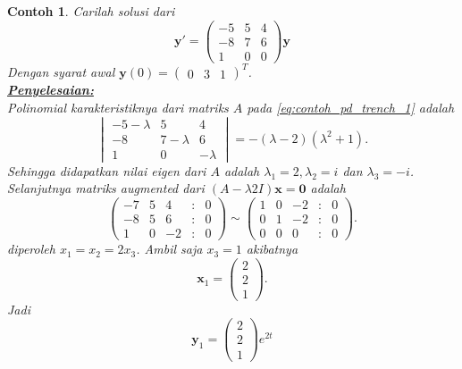 \documentclass[a4paper]{article}
\theoremstyle{definisi}
\newtheorem{contoh}{Contoh}[subsection]
\newcommand{\solusi}{\textbf{\underline{Penyelesaian:}}\\}
\numberwithin{equation}{section}
\begin{document}
  \begin{contoh}
    Carilah solusi dari 
    \begin{equation}\label{eq:contoh_pd_trench_1}
      \mathbf{y'} = \begin{pmatrix}
        -5 & 5 & 4\\
        -8 & 7 & 6\\
        1 & 0 & 0
      \end{pmatrix}\mathbf{y}
    \end{equation}
    Dengan syarat awal $\mathbf{y}(0) = \begin{pmatrix}0&3&1\end{pmatrix}^T$.\\
    \solusi
    Polinomial karakteristiknya dari matriks $A$ pada \eqref{eq:contoh_pd_trench_1} adalah
    \begin{equation}
      \begin{vmatrix}
        -5-\lambda & 5 & 4\\
        -8 & 7-\lambda & 6\\
        1 & 0 & -\lambda
      \end{vmatrix}=-(\lambda-2)(\lambda^2+1).
    \end{equation}
    Sehingga didapatkan nilai eigen dari $A$ adalah $\lambda_1 = 2, \lambda_2 = i$ dan $ \lambda_3 = -i$. Selanjutnya matriks \textit{augmented} dari $(A-\lambda 2I)\mathbf{x} = \mathbf{0}$ adalah
    \begin{equation*}
      \begin{pmatrix}
        -7 & 5 & 4 &:& 0\\
        -8 & 5 & 6 &:& 0\\
        1 & 0 & -2 &:& 0
      \end{pmatrix} \sim \begin{pmatrix}
        1 & 0 & -2 &:& 0\\
        0 & 1 & -2 & :&0\\
        0 & 0 & 0 & :&0
      \end{pmatrix}.
    \end{equation*}
    diperoleh $x_1 = x_2 = 2x_3$. Ambil saja $x_3 = 1$ akibatnya 
    \[\mathbf{x}_1 = \begin{pmatrix}2\\2\\1\end{pmatrix}.\]
    Jadi
    \[\mathbf{y}_1=\begin{pmatrix}2\\2\\1\end{pmatrix}e^{2t}\]

\end{contoh}
\end{document}
